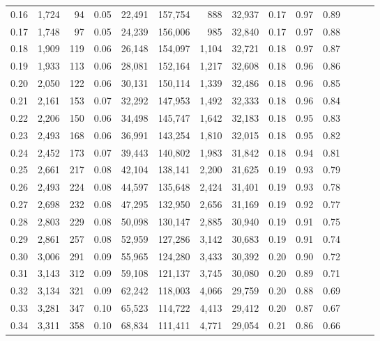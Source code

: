 \begin{tabular}{rrrrrrrrrrrrrr}
0.16 &  1,724 &   94 &  0.05 &   22,491 &  157,754 &     888 &  32,937 &  0.17 &  0.97 &      0.89 \\
0.17 &  1,748 &   97 &  0.05 &   24,239 &  156,006 &     985 &  32,840 &  0.17 &  0.97 &      0.88 \\
0.18 &  1,909 &  119 &  0.06 &   26,148 &  154,097 &   1,104 &  32,721 &  0.18 &  0.97 &      0.87 \\
0.19 &  1,933 &  113 &  0.06 &   28,081 &  152,164 &   1,217 &  32,608 &  0.18 &  0.96 &      0.86 \\
0.20 &  2,050 &  122 &  0.06 &   30,131 &  150,114 &   1,339 &  32,486 &  0.18 &  0.96 &      0.85 \\
0.21 &  2,161 &  153 &  0.07 &   32,292 &  147,953 &   1,492 &  32,333 &  0.18 &  0.96 &      0.84 \\
0.22 &  2,206 &  150 &  0.06 &   34,498 &  145,747 &   1,642 &  32,183 &  0.18 &  0.95 &      0.83 \\
0.23 &  2,493 &  168 &  0.06 &   36,991 &  143,254 &   1,810 &  32,015 &  0.18 &  0.95 &      0.82 \\
0.24 &  2,452 &  173 &  0.07 &   39,443 &  140,802 &   1,983 &  31,842 &  0.18 &  0.94 &      0.81 \\
0.25 &  2,661 &  217 &  0.08 &   42,104 &  138,141 &   2,200 &  31,625 &  0.19 &  0.93 &      0.79 \\
0.26 &  2,493 &  224 &  0.08 &   44,597 &  135,648 &   2,424 &  31,401 &  0.19 &  0.93 &      0.78 \\
0.27 &  2,698 &  232 &  0.08 &   47,295 &  132,950 &   2,656 &  31,169 &  0.19 &  0.92 &      0.77 \\
0.28 &  2,803 &  229 &  0.08 &   50,098 &  130,147 &   2,885 &  30,940 &  0.19 &  0.91 &      0.75 \\
0.29 &  2,861 &  257 &  0.08 &   52,959 &  127,286 &   3,142 &  30,683 &  0.19 &  0.91 &      0.74 \\
0.30 &  3,006 &  291 &  0.09 &   55,965 &  124,280 &   3,433 &  30,392 &  0.20 &  0.90 &      0.72 \\
0.31 &  3,143 &  312 &  0.09 &   59,108 &  121,137 &   3,745 &  30,080 &  0.20 &  0.89 &      0.71 \\
0.32 &  3,134 &  321 &  0.09 &   62,242 &  118,003 &   4,066 &  29,759 &  0.20 &  0.88 &      0.69 \\
0.33 &  3,281 &  347 &  0.10 &   65,523 &  114,722 &   4,413 &  29,412 &  0.20 &  0.87 &      0.67 \\
0.34 &  3,311 &  358 &  0.10 &   68,834 &  111,411 &   4,771 &  29,054 &  0.21 &  0.86 &      0.66 \\

\end{tabular}
